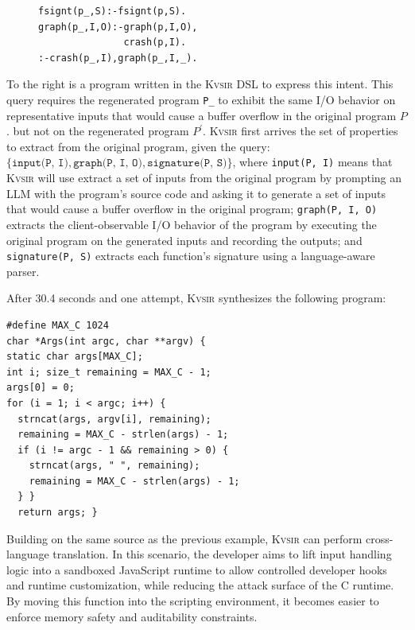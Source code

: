 \documentclass[sigplan,review,anonymous,10pt]{acmart}
\newcommand{\sys}{{\scshape Kv{\textalpha}sir}\xspace}
\newcommand{\ttt}[1]{\texttt{#1}\xspace}
\begin{document}
\begin{figure}
\begin{verbatim}
fsignt(p_,S):-fsignt(p,S).
graph(p_,I,O):-graph(p,I,O),
               crash(p,I).
:-crash(p_,I),graph(p_,I,_).
\end{verbatim}
\end{figure}
To the right is a program written in the \sys DSL to express this intent.
This query requires the regenerated program \texttt{P\_} to exhibit the same
I/O behavior on representative inputs that would cause a buffer overflow in the original program $P$.
but not on the regenerated program $P^\prime$.
\sys first arrives the set of properties to extract from the
original program, given the query:
$\{\ttt{input(P, I)}, \ttt{graph(P, I, O)}, \ttt{signature(P, S)}\}$, where
\texttt{input(P, I)} means that \sys will use extract a set of inputs from the original program
by prompting an LLM with the program's source code and asking it to generate a set of inputs that
would cause a buffer overflow in the original program;
\texttt{graph(P, I, O)} extracts the client-observable I/O behavior of the program
by executing the original program on the generated inputs and recording the outputs;
and \texttt{signature(P, S)} extracts each function's signature using a language-aware parser.

After 30.4 seconds and one attempt, \sys synthesizes the following program:
\begin{verbatim}
#define MAX_C 1024
char *Args(int argc, char **argv) {
static char args[MAX_C];
int i; size_t remaining = MAX_C - 1;
args[0] = 0;
for (i = 1; i < argc; i++) {
  strncat(args, argv[i], remaining);
  remaining = MAX_C - strlen(args) - 1;
  if (i != argc - 1 && remaining > 0) {
    strncat(args, " ", remaining);
    remaining = MAX_C - strlen(args) - 1;
  } }
  return args; }
\end{verbatim}

Building on the same source as the previous example, \sys can perform
cross-language translation.
In this scenario, the developer aims to lift input
handling logic into a sandboxed JavaScript runtime to allow controlled
developer hooks and runtime customization, while reducing the attack surface of
the C runtime.
By moving this function into the scripting environment, it
becomes easier to enforce memory safety and auditability constraints.
\end{document}

